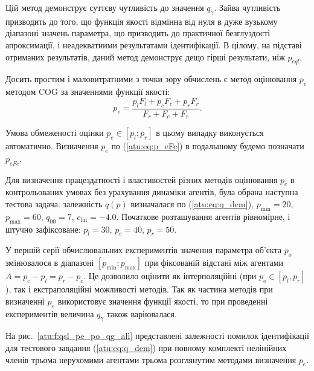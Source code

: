 \documentclass[a4paper,13pt]{atuaref}
\begin{document}
Цій метод демонструє суттєву чутливість до значення $q_\gamma$.
Зайва чутливість призводить до того, що функція якості відмінна від нуля в
дуже вузькому діапазоні значень параметра, що призводить до практичної
безглуздості апроксимації, і неадекватними результатами
ідентифікації.
В цілому, на підставі отриманих результатів, даний метод демонструє дещо
гірші результати, ніж $p_{eql}$.

Досить простим і маловитратними з точки зору обчислень є метод оцінювання $ p_e $ методом
COG за значеннями функції якості:
%
\begin{equation}
  p_e =
  \frac{p_l F_l + p_c F_c + p_r F_r}{ F_r + F_c + F_r}  .
  \label{atu:eq:p_eFc}
\end{equation}

Умова обмеженості оцінки $ p_e \in [p_l; p_r] $ в цьому випадку виконується
автоматично. Визначення $ p_e $ по (\ref{atu:eq:p_eFc}) в подальшому будемо позначати $p_{eFc}$.

Для визначення працездатності і властивостей різних методів оцінювання $ p_e $
в контрольованих умовах без урахування динаміки агентів, була обрана наступна
тестова задача: залежність $ q (p) $ визначалася по (\ref{atu:eq:q_dem}),
$p_{\min}=20$, $p_{\max}=60$,
$q_{00}=7$, $c_\mathrm{lin}=-4.0$.
Початкове розташування агентів рівномірне, і штучно зафіксоване:
$p_l=30$, $p_c=40$,  $p_r=50$.

У першій серії обчислювальних експериментів значення параметра об'єкта $ p_o $
змінювалося в діапазоні $ [p_ {\min}; p_{\max}] $ при фіксованій відстані
між агентами $ A = p_c - p_l = p_r - p_c $. Це дозволило оцінити як
інтерполяційні (при $ p_o \in [p_l, p_r] $), так і екстраполяційні можливості
методів. Так як частина методів при визначенні $ p_e $ використовує значення
функції якості, то при проведенні експериментів величина $ q_\gamma $ також
варіювалася.

На рис.~\ref{atu:f:qsl_pe_po_qg_all} представлені залежності помилок
ідентифікації для тестового завдання (\ref{atu:eq:q_dem}) при повному
комплекті нелінійних членів  трьома нерухомими
агентами трьома розглянутим методами визначення $ p_e $.
\end{document}
